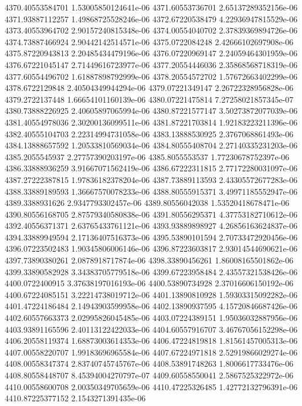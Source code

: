 {4370.40553584701 1.53005850124641e-06
4371.60553736701 2.65137289352156e-06
4371.93887112257 1.49868725528246e-06
4372.67220538479 4.22936947815529e-06
4373.40553964702 2.90157240815348e-06
4374.00554040702 2.37839369894726e-06
4374.73887466924 2.90442142514571e-06
4375.0722084248 2.42666102697908e-06
4375.87220943813 2.20485434479196e-06
4376.07220969147 2.24059464301959e-06
4376.67221045147 2.71449616723977e-06
4377.20554446036 2.35868568718319e-06
4377.60554496702 1.61887898792999e-06
4378.20554572702 1.57672663402299e-06
4378.6722129848 2.40504349944294e-06
4379.07221349147 2.26722328956828e-06
4379.2722137448 1.66654101160139e-06
4380.07221475814 7.27258021857345e-07
4380.73888226925 2.40605897065994e-06
4380.87221577147 3.50273872077039e-06
4381.40554978036 2.30200136099511e-06
4381.87221703814 1.92183223211396e-06
4382.40555104703 2.22314994731058e-06
4383.13888530925 2.3767068861493e-06
4384.13888657592 1.20533810569034e-06
4384.80555408704 2.27140335231203e-06
4385.2055545937 2.27757390203197e-06
4385.8055553537 1.77230678752397e-06
4386.33888936259 3.91667071562419e-06
4386.67222311815 2.77172280031097e-06
4387.27222387815 1.97836182378204e-06
4387.73889113593 2.43305572677283e-06
4388.33889189593 1.36667570078233e-06
4388.80555915371 3.49971185552947e-06
4389.3388931626 2.9347793302457e-06
4389.80556042038 1.53520418678471e-06
4390.80556168705 2.87579340580838e-06
4391.80556295371 4.37753182710612e-06
4392.40556371371 2.63765433761121e-06
4393.93889898927 4.26856163624837e-06
4394.33889949594 2.17136407516373e-06
4395.53890101594 2.70733472920456e-06
4396.07223502483 1.90345806006146e-06
4396.87223603817 2.93014544690621e-06
4397.73890380261 2.0878918717874e-06
4398.33890456261 1.86008165501862e-06
4399.33890582928 3.34383705779518e-06
4399.67223958484 2.43557321538426e-06
4400.0722400915 3.37638197016193e-06
4400.53890734928 2.37016606150192e-06
4400.67224085151 3.22214738019712e-06
4401.13890810928 1.59303315092282e-06
4401.47224186484 2.14943903599958e-06
4402.13890937595 4.15720846687426e-06
4402.60557663373 2.02995826045485e-06
4403.07224389151 1.95036032887956e-06
4403.93891165596 2.40113122422033e-06
4404.60557916707 3.46767056152298e-06
4406.20558119374 1.68873003614353e-06
4406.47224819818 1.81561457005313e-06
4407.00558220707 1.99183696965584e-06
4407.67224971818 2.52919866029274e-06
4408.00558347374 2.83740745745767e-06
4408.53891748263 1.8006617733476e-06
4408.80558448707 8.45394004270797e-07
4409.60558550041 2.5867525322972e-06
4410.00558600708 2.00350349705659e-06
4410.47225326485 1.42772132796391e-06
4410.87225377152 2.1543271391435e-06
}
